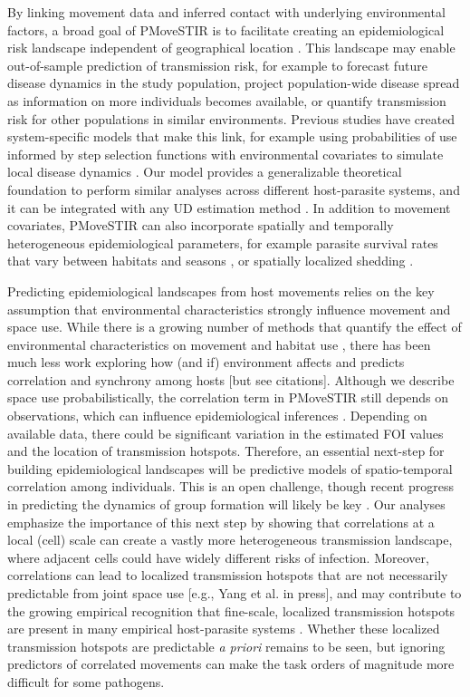 \documentclass[letterpaper]{article}
\begin{document}
By linking movement data and inferred contact with underlying environmental factors, a broad goal of PMoveSTIR is to facilitate creating an epidemiological risk landscape independent of geographical location \citep{Manlove2022}. This landscape may enable out-of-sample prediction of transmission risk, for example to forecast future disease dynamics in the study population, project population-wide disease spread as information on more individuals becomes available, or  quantify transmission risk for other populations in similar environments. Previous studies have created system-specific models that make this link, for example using probabilities of use informed by step selection functions with environmental covariates to simulate local disease dynamics \citep{Merkle2018}. Our model provides a generalizable theoretical foundation to perform similar analyses across different host-parasite systems, and it can be integrated with any UD estimation method \citep{Signer2017,Merkle2018,Michelot2020,Potts2023}. In addition to movement covariates, PMoveSTIR can also incorporate spatially and temporally heterogeneous epidemiological parameters, for example parasite survival rates that vary between habitats and seasons \citep{Daversa2017}, or spatially localized shedding \citep{Weinstein2018a}. 

Predicting epidemiological landscapes from host movements relies on the key assumption that environmental characteristics strongly influence movement and space use. While there is a growing number of methods that quantify the effect of environmental characteristics on movement and habitat use \citep[reviewed in][]{Hooten2017a}, there has been much less work exploring how (and if) environment affects and predicts correlation and synchrony among hosts [but see citations].  Although we describe space use probabilistically, the correlation term in PMoveSTIR still depends on observations, which can influence epidemiological inferences \citep{Wilber2022}. Depending on available data, there could be significant variation in the estimated FOI values and the location of transmission hotspots. Therefore, an essential next-step for building epidemiological landscapes will be predictive models of spatio-temporal correlation among individuals.  This is an open challenge, though recent progress in predicting the dynamics of group formation will likely be key \citep[e.g.][]{Brandell2021}.
Our analyses emphasize the importance of this next step by showing that correlations at a local (cell) scale can create a vastly more heterogeneous transmission landscape, where adjacent cells could have widely different risks of infection.  Moreover, correlations can lead to localized transmission hotspots that are not necessarily predictable from joint space use [e.g., Yang et al. in press], and may contribute to the growing empirical recognition that fine-scale, localized transmission hotspots are present in many empirical host-parasite systems \citep{Albery2021}.  Whether these localized transmission hotspots are predictable \emph{a priori} remains to be seen, but ignoring predictors of correlated movements can make the task orders of magnitude more difficult for some pathogens.
\end{document}

